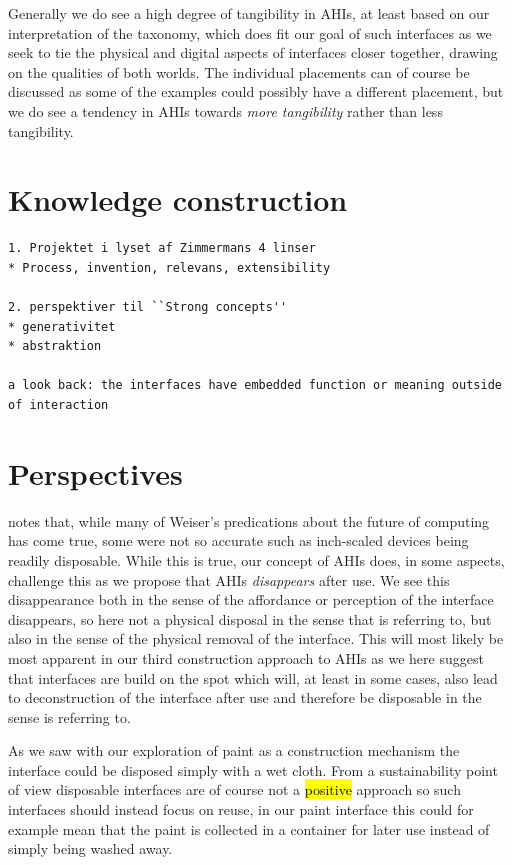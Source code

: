 Generally we do see a high degree of tangibility in AHIs, at least based on our interpretation of the taxonomy, which does fit our goal of such interfaces as we seek to tie the physical and digital aspects of interfaces closer together, drawing on the qualities of both worlds.
The individual placements can of course be discussed as some of the examples could possibly have a different placement, but we do see a tendency in AHIs towards \emph{more tangibility} rather than less tangibility. 

\section{Knowledge construction}

\begin{verbatim}
1. Projektet i lyset af Zimmermans 4 linser
* Process, invention, relevans, extensibility

2. perspektiver til ``Strong concepts''
* generativitet
* abstraktion

a look back: the interfaces have embedded function or meaning outside of interaction
\end{verbatim}

\section{Perspectives}

\citet{abowd2012next} notes that, while many of Weiser's predications about the future of computing has come true, some were not so accurate such as inch-scaled devices being readily disposable.
While this is true, our concept of AHIs does, in some aspects, challenge this as we propose that AHIs \emph{disappears} after use.
We see this disappearance both in the sense of the affordance or perception of the interface disappears, so here not a physical disposal in the sense that \citeauthor{abowd2012next} is referring to, but also in the sense of the physical removal of the interface.
This will most likely be most apparent in our third construction approach to AHIs as we here suggest that interfaces are build on the spot which will, at least in some cases, also lead to deconstruction of the interface after use and therefore be disposable in the sense \citeauthor{abowd2012next} is referring to.

As we saw with our exploration of paint as a construction mechanism the interface could be disposed simply with a wet cloth.
From a sustainability point of view disposable interfaces are of course not a \hl{positive} approach so such interfaces should instead focus on reuse, in our paint interface this could for example mean that the paint is collected in a container for later use instead of simply being washed away. 

